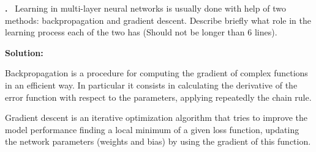 \documentclass[a4paper,12pt]{article} %
\newcounter{problem}
\newcounter{solution}
\newcommand\Problem{%
	\stepcounter{problem}%
	\textbf{\theproblem.}~%
	\setcounter{solution}{0}%
}
\newcommand\Solution{%
	\textbf{Solution:}\\%
}
\begin{document}
	\Problem{Learning in multi-layer neural networks is usually done with help 
	of two methods: backpropagation and gradient descent. Describe briefly 
	what role in the learning process each of the two has (Should not be longer 
	than $6$ lines).}\medskip
	
	\Solution{Backpropagation is a procedure for computing the gradient of 
	complex functions in an efficient way. In particular it consists in 
	calculating the derivative of the error function with respect to the 
	parameters, applying repeatedly the chain rule.\medskip
	
	Gradient descent is an iterative optimization algorithm that tries to 
	improve the model performance finding a local minimum of a given loss 
	function, updating the network parameters (weights and bias) by using the 
	gradient of this function. }
\end{document}
